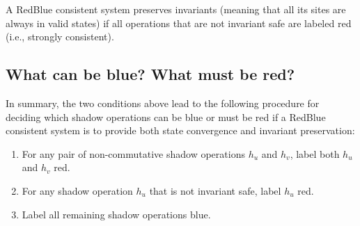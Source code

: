 \begin{theorem}
A RedBlue consistent system preserves invariants (meaning that all its sites are always in valid states) if all operations that are not invariant safe are labeled red (i.e., strongly consistent).
\end{theorem}
\fi

\subsection{What can be blue?  What must be red?}
\label{ch:redblue:sect:labelmethod}
In summary, the two conditions above lead to the following procedure for deciding
which shadow operations can be
blue or must be red if a RedBlue consistent system is to provide both
state convergence and invariant preservation:
\begin{enumerate}%
\item For any pair of non-commutative shadow operations $h_u$ and $h_v$, label both $h_u$ and $h_v$ red.
\item For any shadow operation $h_u$ that is not invariant safe,
label $h_u$ red.
\item Label all remaining shadow operations blue.
\end{enumerate}

